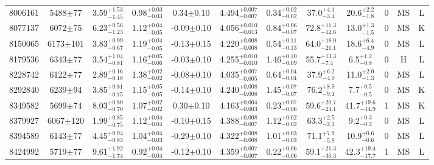 \begin{longtable}{c|ccccc|ccc|ccc}
8006161 & 5488$\pm$77    & 3.59$_{-1.45}^{+1.53}$    & 0.98$_{-0.03}^{+0.03}$ & 0.34$\pm$0.10     & 4.494$_{-0.007}^{+0.007}$ & 0.34$_{-0.02}^{+0.02}$ & 37.0$_{-3.4}^{+4.1}$      & 20.6$_{-1.8}^{+2.2}$     & 0 &        MS & L \\
8077137 & 6072$\pm$75    & 6.23$_{-1.23}^{+0.56}$    & 1.12$_{-0.05}^{+0.04}$ & -0.09$\pm$0.10    & 4.056$_{-0.013}^{+0.010}$ & 0.84$_{-0.07}^{+0.06}$ & 72.8$_{-12.6}^{+11.3}$    & 13.0$_{-1.5}^{+1.3}$     & 0 &        MS & K \\
8150065 & 6173$\pm$101   & 3.83$_{-0.67}^{+0.99}$    & 1.19$_{-0.05}^{+0.04}$ & -0.13$\pm$0.15    & 4.220$_{-0.008}^{+0.008}$ & 0.54$_{-0.13}^{+0.11}$ & 64.0$_{-21.1}^{+18.0}$    & 18.6$_{-4.9}^{+6.4}$     & 0 &        MS & L \\
8179536 & 6343$\pm$77    & 3.54$_{-0.81}^{+1.04}$    & 1.16$_{-0.06}^{+0.05}$ & -0.03$\pm$0.10    & 4.255$_{-0.010}^{+0.010}$ & 1.46$_{-0.09}^{+0.10}$ & 55.7$_{-7.4}^{+13.3}$     & 6.5$_{-0.8}^{+1.2}$      & 0 &        H & L \\
8228742 & 6122$\pm$77    & 2.89$_{-0.18}^{+0.16}$    & 1.38$_{-0.02}^{+0.02}$ & -0.08$\pm$0.10    & 4.035$_{-0.005}^{+0.007}$ & 0.64$_{-0.04}^{+0.04}$ & 37.9$_{-4.0}^{+6.2}$      & 11.0$_{-1.3}^{+2.0}$     & 0 &        MS & L \\
8292840 & 6239$\pm$94    & 3.85$_{-0.75}^{+0.81}$    & 1.15$_{-0.05}^{+0.05}$ & -0.14$\pm$0.10    & 4.240$_{-0.008}^{+0.008}$ & 1.45$_{-0.07}^{+0.07}$ & 76.2$_{-9.1}^{+8.9}$      & 7.7$_{-0.5}^{+0.5}$      & 0 &        MS & K \\
8349582 & 5699$\pm$74    & 8.03$_{-0.70}^{+0.80}$    & 1.07$_{-0.02}^{+0.02}$ & 0.30$\pm$0.10     & 4.163$_{-0.003}^{+0.004}$ & 0.23$_{-0.06}^{+0.07}$ & 59.6$_{-24.1}^{+20.7}$    & 41.7$_{-14.9}^{+19.6}$   & 1 &        MS & K \\
8379927 & 6067$\pm$120   & 1.99$_{-0.75}^{+0.85}$    & 1.12$_{-0.04}^{+0.04}$ & -0.10$\pm$0.15    & 4.388$_{-0.007}^{+0.008}$ & 1.12$_{-0.02}^{+0.02}$ & 63.3$_{-2.3}^{+2.5}$      & 9.2$_{-0.2}^{+0.3}$      & 0 &        MS & L \\
8394589 & 6143$\pm$77    & 4.45$_{-0.83}^{+0.94}$    & 1.04$_{-0.03}^{+0.04}$ & -0.29$\pm$0.10    & 4.322$_{-0.008}^{+0.008}$ & 1.01$_{-0.03}^{+0.03}$ & 71.1$_{-5.9}^{+7.9}$      & 10.9$_{-0.6}^{+0.6}$     & 0 &        MS & L \\
8424992 & 5719$\pm$77    & 9.61$_{-1.74}^{+1.92}$    & 0.92$_{-0.04}^{+0.04}$ & -0.12$\pm$0.10    & 4.359$_{-0.007}^{+0.007}$ & 0.22$_{-0.06}^{+0.06}$ & 59.1$_{-30.3}^{+21.3}$    & 42.3$_{-17.7}^{+19.4}$   & 1 &        MS & L \\

\end{longtable}
